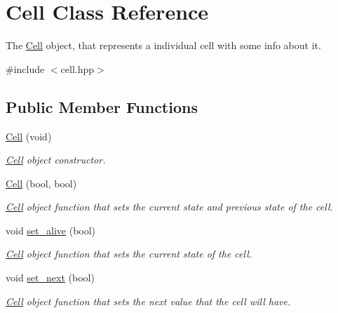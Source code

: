 \hypertarget{class_cell}{}\section{Cell Class Reference}
\label{class_cell}


The \mbox{\hyperlink{class_cell}{Cell}} object, that represents a individual cell with some info about it.  




{\ttfamily \#include $<$cell.\+hpp$>$}

\subsection*{Public Member Functions}
\begin{DoxyCompactItemize}
\item 
\mbox{\label{class_cell_aab24f3f223f86c03968096edbd40a9f0}} 
\mbox{\hyperlink{class_cell_aab24f3f223f86c03968096edbd40a9f0}{Cell}} (void)
\begin{DoxyCompactList}\small\item\em \mbox{\hyperlink{class_cell}{Cell}} object constructor. \end{DoxyCompactList}\item 
\mbox{\hyperlink{class_cell_a7bd32ff9f08a21330169bb4d8cf09a46}{Cell}} (bool, bool)
\begin{DoxyCompactList}\small\item\em \mbox{\hyperlink{class_cell}{Cell}} object function that sets the current state and previous state of the cell. \end{DoxyCompactList}\item 
void \mbox{\hyperlink{class_cell_a4fc1b2e37891b5844cc11a0820ca6173}{set\+\_\+alive}} (bool)
\begin{DoxyCompactList}\small\item\em \mbox{\hyperlink{class_cell}{Cell}} object function that sets the current state of the cell. \end{DoxyCompactList}\item 
void \mbox{\hyperlink{class_cell_a25ca55e576079dda0ada13d21c817030}{set\+\_\+next}} (bool)
\begin{DoxyCompactList}\small\item\em \mbox{\hyperlink{class_cell}{Cell}} object function that sets the next value that the cell will have. \end{DoxyCompactList}\item 

\end{DoxyCompactItemize}

